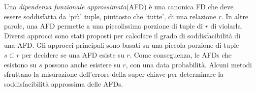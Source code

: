 Una \textit{dipendenza funzionale approssimata}(AFD) è una canonica FD che deve essere soddisfatta da \textquoteleft più' tuple, piuttosto che \textquoteleft tutte', di una relazione $r$. In altre parole, una AFD permette a una piccolissima porzione di tuple di $r$ di violarla. Diversi approcci sono stati proposti per calcolare il grado di soddisfacibilità di una AFD. Gli approcci principali sono basati su una piccola porzione di tuple $s \subset r$ per decidere se una AFD esiste su $r$. Come conseguenza, le AFDs che esistono su $s$ possono anche esistere su $r$, con una data probabilità. Alcuni metodi sfruttano la misurazione dell'errore della super chiave per determinare la soddisfacibilità approssima delle AFDs.   